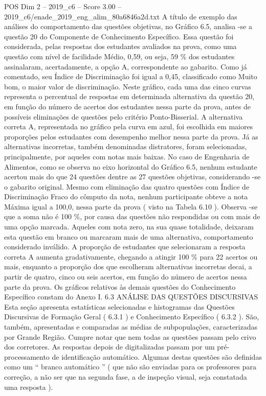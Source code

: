 \begin{textsample}{POS Dim 2 – 2019\_c6 – Score 3.00 – 2019\_c6/enade\_2019\_eng\_alim\_80a6846a2d.txt}
A título de exemplo das análises do comportamento das questões objetivas, no Gráfico 6.5, analisa -se a questão 20 do Componente de Conhecimento Específico.
Essa questão foi considerada, pelas respostas dos estudantes avaliados na prova, como uma questão com nível de facilidade Médio, 0,59, ou seja, 59 \% dos estudantes assinalaram, acertadamente, a opção A, correspondente ao gabarito.
Como já comentado, seu Índice de Discriminação foi igual a 0,45, classificado como Muito bom, o maior valor de discriminação.
Neste gráfico, cada uma das cinco curvas representa o percentual de respostas em determinada alternativa da questão 20, em função do número de acertos dos estudantes nessa parte da prova, antes de possíveis eliminações de questões pelo critério Ponto-Bisserial.
A alternativa correta A, representada no gráfico pela curva em azul, foi escolhida em maiores proporções pelos estudantes com desempenho melhor nessa parte da prova.
Já as alternativas incorretas, também denominadas distratores, foram selecionadas, principalmente, por aqueles com notas mais baixas.
No caso de Engenharia de Alimentos, como se observa no eixo horizontal do Gráfico 6.5, nenhum estudante acertou mais do que 24 questões dentre as 27 questões objetivas, considerando -se o gabarito original.
Mesmo com eliminação das quatro questões com Índice de Discriminação Fraco do cômputo da nota, nenhum participante obteve a nota Máxima igual a 100,0, nessa parte da prova ( visto na Tabela 6.10 ).
Observa -se que a soma não é 100 \%, por causa das questões não respondidas ou com mais de uma opção marcada.
Aqueles com nota zero, na sua quase totalidade, deixaram esta questão em branco ou marcaram mais de uma alternativa, comportamento considerado inválido.
A proporção de estudantes que selecionaram a resposta correta A aumenta gradativamente, chegando a atingir 100 \% para 22 acertos ou mais, enquanto a proporção dos que escolheram alternativas incorretas decai, a partir de quatro, cinco ou seis acertos, em função do número de acertos nessa parte da prova.
Os gráficos relativos às demais questões do Conhecimento Específico constam do Anexo I. 6.3 ANÁLISE DAS QUESTÕES DISCURSIVAS Esta seção apresenta estatísticas selecionadas e histogramas das Questões Discursivas de Formação Geral ( 6.3.1 ) e Conhecimento Específico ( 6.3.2 ).
São, também, apresentadas e comparadas as médias de subpopulações, caracterizadas por Grande Região.
Cumpre notar que nem todas as questões passam pelo crivo dos corretores.
As respostas depois de digitalizadas passam por um pré-processamento de identificação automático.
Algumas destas questões são definidas como um “ branco automático ” ( que não são enviadas para os professores para correção, a não ser que na segunda fase, a de inspeção visual, seja constatada uma resposta ).

\end{textsample}
